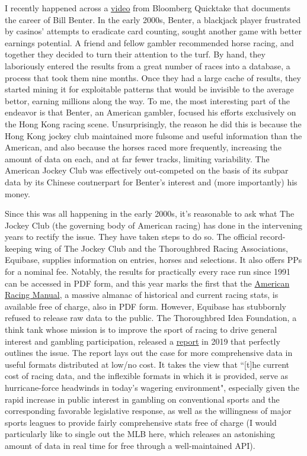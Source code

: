 \documentclass{article}
\begin{document}
I recently happened across a \href{https://www.youtube.com/watch?v=4B0mGYZqElo}{video} from Bloomberg Quicktake that documents the career of Bill Benter. In the early 2000s, Benter, a blackjack player frustrated by casinos' attempts to eradicate card counting, sought another game with better earnings potential. A friend and fellow gambler recommended horse racing, and together they decided to turn their attention to the turf. By hand, they laboriously entered the results from a great number of races into a database, a process that took them nine months. Once they had a large cache of results, they started mining it for exploitable patterns that would be invisible to the average bettor, earning millions along the way. To me, the most interesting part of the endeavor is that Benter, an American gambler, focused his efforts exclusively on the Hong Kong racing scene. Unsurprisingly, the reason he did this is because the Hong Kong jockey club maintained more fulsome and useful information than the American, and also because the horses raced more frequently, increasing the amount of data on each, and at far fewer tracks, limiting variability. The American Jockey Club was effectively out-competed on the basis of its subpar data by its Chinese coutnerpart for Benter's interest and (more importantly) his money.

Since this was all happening in the early 2000s, it's reasonable to ask what The Jockey Club (the governing body of American racing) has done in the intervening years to rectify the issue. They have taken steps to do so. The official record-keeping wing of The Jockey Club and the Thoroughbred Racing Associations, Equibase, supplies information on entries, horses and selections. It also offers PPs for a nominal fee. Notably, the results for practically every race run since 1991 can be accessed in PDF form, and this year marks the first that the \href{http://jockeyclub.com/factbook/ARM/2021_arm.pdf}{American Racing Manual}, a massive almanac of historical and current racing stats, is available free of charge, also in PDF form. However, Equibase has stubbornly refused to release raw data to the public. The Thoroughbred Idea Foundation, a think tank whose mission is to improve the sport of racing to drive general interest and gambling participation, released a \href{https://racingthinktank.com/application/files/5015/5231/3157/20190311_-_TIF_REPORTS_-_Embracing_a_Future_with_Free_Racing_Data.pdf}{report} in 2019 that perfectly outlines the issue. The report lays out the case for more comprehensive data in useful formats distributed at low/no cost. It takes the view that ``[t]he current cost of racing data, and the inflexible formats in which it is provided, serve as hurricane-force headwinds in today’s wagering environment", especially given the rapid increase in public interest in gambling on conventional sports and the corresponding favorable legislative response, as well as the willingness of major sports leagues to provide fairly comprehensive stats free of charge (I would particularly like to single out the MLB here, which releases an astonishing amount of data in real time for free through a well-maintained API).
\end{document}
